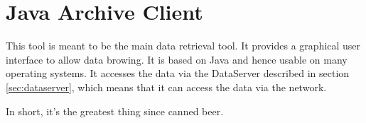 \section{Java Archive Client}
This tool is meant to be the main data retrieval tool. It provides a
graphical user interface to allow data browing. It is based on Java
and hence usable on many operating systems. It accesses the data via
the DataServer described in section \ref{sec:dataserver}, which means
that it can access the data via the network.

In short, it's the greatest thing since canned beer.